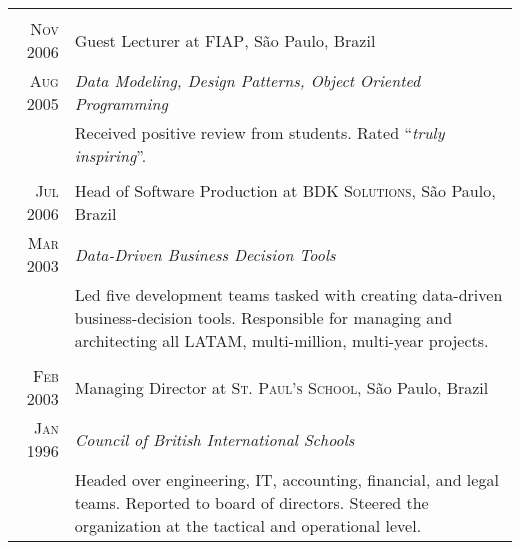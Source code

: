 \documentclass[a4paper,10pt]{article}
\begin{document}
\begin{tabular}{r|p{11cm}}
  \multicolumn{2}{c}{}\\

  \textsc{Nov 2006} & Guest Lecturer at \textsc{FIAP}, S\~{a}o Paulo, Brazil \\

  \textsc{Aug 2005} & \emph{Data Modeling, Design Patterns, Object Oriented
    Programming} \\

  &\footnotesize{Received positive review from students. Rated ``\emph{truly
      inspiring}''.}\\

  \multicolumn{2}{c}{}\\

  \textsc{Jul 2006} & Head of Software Production at \textsc{BDK Solutions},
  S\~{a}o Paulo, Brazil \\

  \textsc{Mar 2003} & \emph{Data-Driven Business Decision Tools} \\

  &\footnotesize{Led five development teams tasked with creating data-driven
    business-decision tools. Responsible for managing and architecting all
    LATAM, multi-million, multi-year projects.}\\

  \multicolumn{2}{c}{}\\

  \textsc{Feb 2003} & Managing Director at \textsc{St. Paul's School}, S\~{a}o
  Paulo, Brazil \\

  \textsc{Jan 1996} & \emph{Council of British International Schools} \\

  &\footnotesize{Headed over engineering, IT, accounting, financial, and legal
    teams. Reported to board of directors. Steered the organization at the
    tactical and operational level.}\\

\end{tabular}


\end{document}
